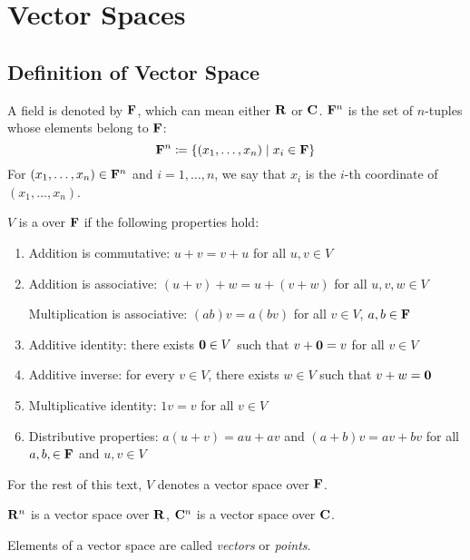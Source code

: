 \chapter{Vector Spaces}\label{chap:vector-spaces}
\section{Definition of Vector Space}
\begin{notation}
A field is denoted by $\mathbf F$, which can mean either $\mathbf R$ or $\mathbf C$. $\mathbf F^n$ is the set of $n$-tuples whose elements belong to $\mathbf F$:
\[\mathbf F^n\coloneqq\{(x_1,\dots,x_n)\mid x_i\in\mathbf F\}\]
For $(x_1,\dots,x_n)\in\mathbf F^n$ and $i=1,\dots,n$, we say that $x_i$ is the $i$-th coordinate of $(x_1,\dots,x_n)$.
\end{notation}

\begin{definition}
$V$ is a  over $\mathbf F$ if the following properties hold:
\begin{enumerate}[label=(\roman*)]
\item Addition is commutative: $u+v=v+u$ for all $u,v\in V$
\item Addition is associative: $(u+v)+w=u+(v+w)$ for all $u,v,w\in V$

Multiplication is associative: $(ab)v=a(bv)$ for all $v\in V$, $a,b\in\mathbf F$
\item Additive identity: there exists $\vb{0}\in V$ such that $v+\vb{0}=v$ for all $v\in V$
\item Additive inverse: for every $v\in V$, there exists $w\in V$ such that $v+w=\vb{0}$
\item Multiplicative identity: $1v=v$ for all $v\in V$
\item Distributive properties: $a(u+v)=au+av$ and $(a+b)v=av+bv$ for all $a,b,\in\mathbf F$ and $u,v\in V$
\end{enumerate}
\end{definition}

\begin{notation}
For the rest of this text, $V$ denotes a vector space over $\mathbf F$.
\end{notation}

\begin{example}
$\mathbf R^n$ is a vector space over $\mathbf R$, $\mathbf C^n$ is a vector space over $\mathbf C$.
\end{example}

Elements of a vector space are called \emph{vectors} or \emph{points}.

